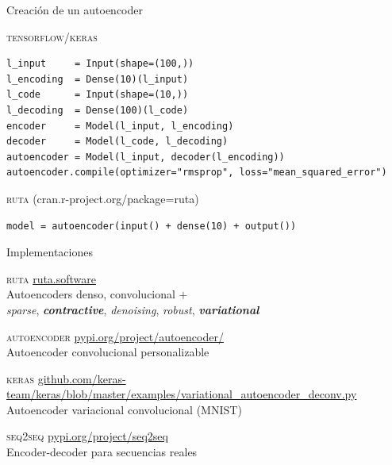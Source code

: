 \documentclass[13.5pt,aspectratio=169]{beamer}
\begin{document}
     \begin{frame}[fragile]{Creación de un autoencoder}

      \textsc{\color{colorblue}tensorflow/keras}\\
      \begin{verbatim}
l_input     = Input(shape=(100,))
l_encoding  = Dense(10)(l_input)
l_code      = Input(shape=(10,))
l_decoding  = Dense(100)(l_code)
encoder     = Model(l_input, l_encoding)
decoder     = Model(l_code, l_decoding)
autoencoder = Model(l_input, decoder(l_encoding))
autoencoder.compile(optimizer="rmsprop", loss="mean_squared_error")\end{verbatim}

      \textsc{\color{colorblue}ruta} {\small(cran.r-project.org/package=ruta)}\\
      \begin{verbatim}
model = autoencoder(input() + dense(10) + output())
      \end{verbatim}
     \end{frame}
     
     \begin{frame}{Implementaciones}
      \begin{fullpageitemize}
      \item\textsc{\color{colorblue}ruta} {\small\url{ruta.software}}\\
      Autoencoders denso, convolucional $+$\\\textit{sparse}, \textit{\textbf{\color{colorblue}contractive}},  \textit{denoising}, \textit{robust}, \textit{\textbf{\color{colorblue}variational}}
      

      \item\textsc{\color{colorblue}autoencoder} {\small\url{pypi.org/project/autoencoder/}}\\
      Autoencoder convolucional personalizable

      \item\textsc{\color{colorblue}keras} {\small\url{github.com/keras-team/keras/blob/master/examples/variational\_autoencoder\_deconv.py}}\\
      Autoencoder variacional convolucional (MNIST)

      \item\textsc{\color{colorblue}seq2seq} {\small\url{pypi.org/project/seq2seq}}\\
      Encoder-decoder para secuencias reales

      
        
      \end{fullpageitemize}
     \end{frame}
\end{document}
